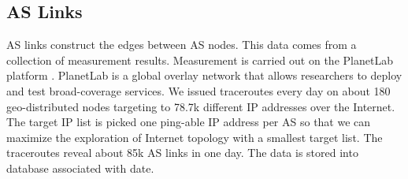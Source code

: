 \documentclass[letterpaper,twocolumn,11pt]{article}
\begin{document}
{\subsection{AS Links}
AS links construct the edges between AS nodes. This data comes from a collection of measurement results. Measurement is carried out on the PlanetLab platform \cite{chun2003planetlab}. PlanetLab is a global overlay network that allows researchers to deploy and test broad-coverage services. We issued traceroutes every day on about 180 geo-distributed nodes targeting to 78.7k different IP addresses over the Internet. The target IP list is picked one ping-able IP address per AS so that we can maximize the exploration of Internet topology with a smallest target list. The traceroutes reveal about 85k AS links in one day. The data is stored into database associated with date.





}
\end{document}
